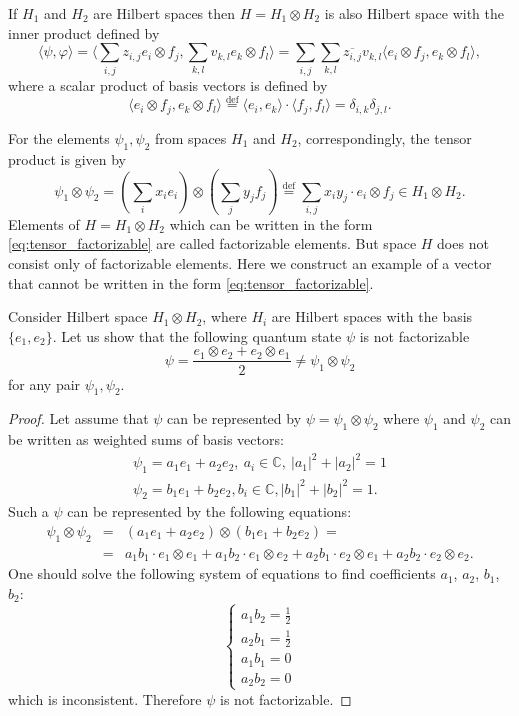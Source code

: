 \documentclass[11pt]{article}
\begin{document}
If $H_1$ and $H_2$ are Hilbert spaces then $H = H_1\otimes H_2$ is also Hilbert space with the inner product defined by
\[
\langle\psi, \varphi\rangle = \langle \sum_{i,j}z_{i,j}e_i\otimes f_j, \sum_{k,l}v_{k,l}e_k\otimes f_l \rangle = \sum_{i, j}\sum_{k, l}\overline{z_{i,j}}v_{k,l} \langle e_i\otimes f_j, e_k\otimes f_l \rangle,
\]
where a scalar product of basis vectors is defined by
\[
\langle e_i\otimes f_j, e_k\otimes f_l \rangle \overset{\mbox{def}}= \langle e_i, e_k\rangle \cdot \langle f_j, f_l \rangle = \delta_{i, k}\delta_{j, l}.
\]

For the elements $\psi_1, \psi_2$ from spaces $H_1$ and $H_2$, correspondingly, the tensor product is given by
\begin{equation}
\psi_1 \otimes \psi_2 = \left(\sum_ix_ie_i\right) \otimes \left(\sum_jy_jf_j\right) \overset{\mbox{def}}= \sum_{i, j} x_iy_j \cdot e_i \otimes f_j \in H_1 \otimes H_2.
\label{eq:tensor_factorizable}
\end{equation}
Elements of $H = H_1\otimes H_2$ which can be written in the form \eqref{eq:tensor_factorizable} are called factorizable elements. But space $H$ does not consist only of factorizable elements. Here we construct an example of a vector that cannot be written in the form  \eqref{eq:tensor_factorizable}.

Consider Hilbert space $H_1\otimes H_2$, where $H_i$ are Hilbert spaces with the basis $\{e_1, e_2\}$. Let us show that the following quantum state $\psi$ is not factorizable
\[
	\psi = \frac{e_1 \otimes e_2 + e_2 \otimes e_1}{2} \ne \psi_1 \otimes \psi_2
\]
for any pair $\psi_1, \psi_2$.
\begin{proof}
Let assume that $\psi$ can be represented by $\psi = \psi_1\otimes\psi_2$ where
$\psi_1$ and $\psi_2$ can be written as weighted sums of basis vectors:
\begin{gather*}
	\psi_1 = a_1 e_1 + a_2 e_2,\ a_i\in \mathbb{C},\ |a_1|^2 + |a_2|^2 = 1 \\
	\psi_2 = b_1 e_1 + b_2 e_2, b_i\in \mathbb{C}, |b_1|^2 + |b_2|^2 = 1.
\end{gather*}
Such a $\psi$ can be represented by the following equations:
\begin{eqnarray*}
	\psi_1 \otimes \psi_2 &=& (a_1 e_1 + a_2 e_2) \otimes (b_1 e_1 + b_2 e_2) = \\ &=&  
	a_1 b_1 \cdot e_1 \otimes e_1 + a_1 b_2 \cdot e_1 \otimes e_2 + 
	a_2 b_1 \cdot e_2 \otimes e_1 + a_2 b_2 \cdot e_2 \otimes e_2.
\end{eqnarray*}
One should solve the following system of equations to find coefficients $a_1$, $a_2$, $b_1$, $b_2$:
$$
\begin{cases}
a_1 b_2 = \frac12 \\
a_2 b_1 = \frac12 \\
a_1 b_1 = 0 \\
a_2 b_2 = 0
\end{cases}
$$
which is inconsistent. Therefore $\psi$ is not factorizable.
\end{proof}
 
\end{document}
